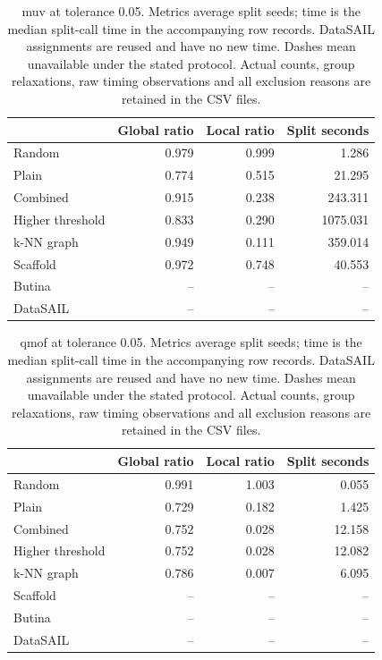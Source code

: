 \begin{table}[htbp]\centering\small
\begin{tabular}{lrrr}
\toprule
 & Global ratio & Local ratio & Split seconds \\
\midrule
Random & 0.979 & 0.999 & 1.286 \\
Plain & 0.774 & 0.515 & 21.295 \\
Combined & 0.915 & 0.238 & 243.311 \\
Higher threshold & 0.833 & 0.290 & 1075.031 \\
k-NN graph & 0.949 & 0.111 & 359.014 \\
Scaffold & 0.972 & 0.748 & 40.553 \\
Butina & -- & -- & -- \\
DataSAIL & -- & -- & -- \\
\bottomrule
\end{tabular}

\caption{muv at tolerance 0.05. Metrics average split seeds; time is the median split-call time in the accompanying row records. DataSAIL assignments are reused and have no new time. Dashes mean unavailable under the stated protocol. Actual counts, group relaxations, raw timing observations and all exclusion reasons are retained in the CSV files.}\end{table}
\begin{table}[htbp]\centering\small
\begin{tabular}{lrrr}
\toprule
 & Global ratio & Local ratio & Split seconds \\
\midrule
Random & 0.991 & 1.003 & 0.055 \\
Plain & 0.729 & 0.182 & 1.425 \\
Combined & 0.752 & 0.028 & 12.158 \\
Higher threshold & 0.752 & 0.028 & 12.082 \\
k-NN graph & 0.786 & 0.007 & 6.095 \\
Scaffold & -- & -- & -- \\
Butina & -- & -- & -- \\
DataSAIL & -- & -- & -- \\
\bottomrule
\end{tabular}

\caption{qmof at tolerance 0.05. Metrics average split seeds; time is the median split-call time in the accompanying row records. DataSAIL assignments are reused and have no new time. Dashes mean unavailable under the stated protocol. Actual counts, group relaxations, raw timing observations and all exclusion reasons are retained in the CSV files.}\end{table}
